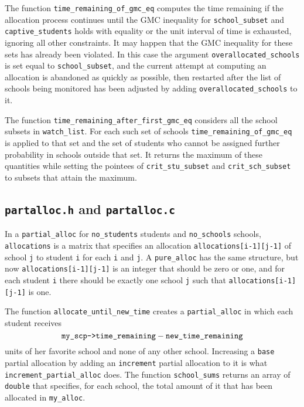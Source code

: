 \documentclass[12pt]{article}
\theoremstyle{definition}
\begin{document}
\begin{appendix}
The function \texttt{time\_remaining\_of\_gmc\_eq} computes the time
remaining if the allocation process continues until the GMC inequality
for \texttt{school\_subset} and \texttt{captive\_students} holds with
equality or the unit interval of time is exhausted, ignoring all other
constraints.  It may happen that the GMC inequality for these sets has
already been violated.  In this case the argument
\texttt{overallocated\_schools} is set equal to
\texttt{school\_subset}, and the current attempt at computing an
allocation is abandoned as quickly as possible, then restarted after
the list of schools being monitored has been adjusted by adding
\texttt{overallocated\_schools} to it.

The function \texttt{time\_remaining\_after\_first\_gmc\_eq} considers
all the school subsets in \texttt{watch\_list}.  For each such set of
schools \texttt{time\_remaining\_of\_gmc\_eq} is applied to that set
and the set of students who cannot be assigned further probability in
schools outside that set.  It returns the maximum of these quantities
while setting the pointees of \texttt{crit\_stu\_subset} and
\texttt{crit\_sch\_subset} to subsets that attain the maximum.

\subsection{\texttt{partalloc.h} and \texttt{partalloc.c}}

In a \texttt{partial\_alloc} for \texttt{no\_students} students and
\texttt{no\_schools} schools, \texttt{allocations} is a matrix that
specifies an allocation \texttt{allocations[i-1][j-1]} of school
\texttt{j} to student \texttt{i} for each \texttt{i} and \texttt{j}.
A \texttt{pure\_alloc} has the same structure, but now
\texttt{allocations[i-1][j-1]} is an integer that should be zero or
one, and for each student \texttt{i} there should be exactly one
school \texttt{j} such that \texttt{allocations[i-1][j-1]} is one.

The function
\texttt{allocate\_until\_new\_time} creates a \texttt{partial\_alloc}
in which each student receives
$$\text{\texttt{my\_scp->time\_remaining}} -
\text{\texttt{new\_time\_remaining}}$$ units of her favorite school
and none of any other school.  Increasing a \texttt{base} partial
allocation by adding an \texttt{increment} partial allocation to it is
what \texttt{increment\_partial\_alloc} does.  The function
\texttt{school\_sums} returns an array of \texttt{double} that
specifies, for each school, the total amount of it that has been
allocated in \texttt{my\_alloc}.


\end{appendix}
\end{document}
